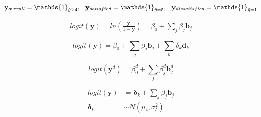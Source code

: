 \documentclass{paper}
\begin{document}
\begin{equation*}
\mathbf{y}_{overall} = \mathds{1}_{\hat{y} \geq 4}, 
\hspace*{2.5mm} 
\mathbf{y}_{satisfied} = \mathds{1}_{\hat{y} = 5}, 
\hspace*{2.5mm} 
\mathbf{y}_{dissatisfied} = \mathds{1}_{\hat{y} = 1}
\end{equation*}


\makeatletter
\def\maketag@@@#1{\hbox{\hspace{2cm}\m@th\normalfont#1}}
\makeatother

\begin{equation*}
  \begin{gathered}
    logit(\mathbf{y}) = ln\left(\frac{\mathbf{y}}{1-\mathbf{y}}\right) = \beta_0 + \sum_j \beta_j \mathbf{b}_j
    \tag{w/o intent}
    \end{gathered}
\end{equation*}


\begin{equation}
  logit(\mathbf{y}) = \beta_0 + \sum_j \beta_j \mathbf{b}_j + \sum_k \delta_k \mathbf{d}_k
  \tag{w intent}
\end{equation}

\begin{equation}
  logit(\mathbf{y}^d) = \beta^{d}_{0} + \sum_j \beta^{d}_{j} \mathbf{b}^{d}_{j}
    \tag{catch-up, ...}
\end{equation}

\vspace*{-\abovedisplayskip}


\begin{align*}
logit(\mathbf{y}) & = \mathbf{\delta}_k + \sum_j \beta_j \mathbf{b}_j\\
  \mathbf{\delta}_k & \sim N(\mu_{\delta}, \sigma^2_{\delta})
                      \tag{multiLevel}
\end{align*}
\end{document}
